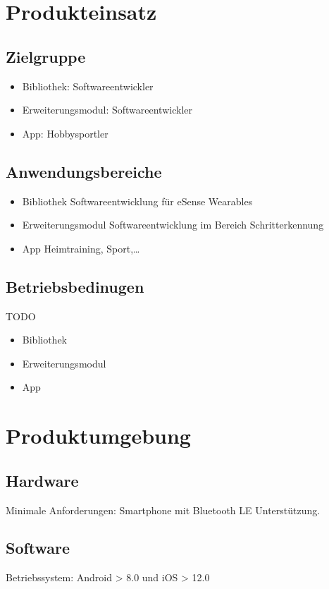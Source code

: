 \documentclass[a4paper,12pt]{article}
\begin{document}

\section{Produkteinsatz}
  \subsection{Zielgruppe}
  \begin{itemize}
    \item\textsf{Bibliothek:} Softwareentwickler
    \item\textsf{Erweiterungsmodul:} Softwareentwickler
    \item\textsf{App:} Hobbysportler
  \end{itemize}
  \subsection{Anwendungsbereiche}
    \begin{itemize}
      \item\textsf{Bibliothek} Softwareentwicklung für eSense Wearables
      \item\textsf{Erweiterungsmodul} Softwareentwicklung im Bereich Schritterkennung
      \item\textsf{App} Heimtraining, Sport,\dots
    \end{itemize}
  \subsection{Betriebsbedinugen}
  TODO
    \begin{itemize}
      \item\textsf{Bibliothek} 
      \item\textsf{Erweiterungsmodul}
      \item\textsf{App}
    \end{itemize}

\section{Produktumgebung}
\subsection{Hardware} \textsf{Minimale Anforderungen:} Smartphone mit Bluetooth LE Unterstützung.
\subsection{Software} \textsf{Betriebssystem:} Android > 8.0 und iOS > 12.0
\end{document}
